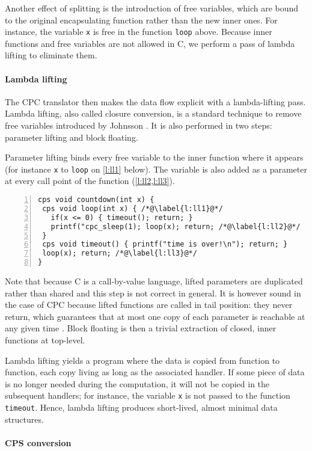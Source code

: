 \documentclass[a4paper]{llncs}
\begin{document}
Another effect of splitting is the introduction of free variables, which are
bound to the original encapsulating function rather than the new inner ones.
For instance, the variable \texttt{x} is free in the function \texttt{loop}
above.  Because inner functions and free variables are not allowed in C, we
perform a pass of lambda lifting to eliminate them.

\paragraph{Lambda lifting}

The CPC translator then makes the data flow explicit with a lambda-lifting pass.
Lambda lifting, also called closure conversion, is a standard technique to
remove free variables introduced by Johnsson \cite{DBLP:conf/fpca/Johnsson85}.
It is also performed in two steps: parameter lifting and block floating.

Parameter lifting binds every free variable to the inner function where it
appears (for instance \texttt{x} to \texttt{loop} on \cref{l:ll1} below).  The
variable is also added as a parameter at every call point of the function
(\cref{l:ll2,l:ll3}).
\begin{lstlisting}[numbers=left]
cps void countdown(int x) {
 cps void loop(int x) { /*@\label{l:ll1}@*/
   if(x <= 0) { timeout(); return; }
   printf("cpc_sleep(1); loop(x); return; /*@\label{l:ll2}@*/
 }
 cps void timeout() { printf("time is over!\n"); return; }
 loop(x); return; /*@\label{l:ll3}@*/
}
\end{lstlisting}
Note that because C is a call-by-value language, lifted parameters are
duplicated rather than shared and this step is not correct in general.
It is however sound in the case of CPC because lifted functions are called in
tail position: they never return, which guarantees that at most one copy of each
parameter is reachable at any given time \cite{kerneis2011}.
Block floating is then a trivial extraction of closed, inner functions at
top-level.

Lambda lifting yields a program where the data is copied from function to
function, each copy living as long as the associated handler.  If some piece of
data is no longer needed during the computation, it will not be copied in the
subsequent handlers; for instance, the variable \texttt{x} is not passed to the
function \texttt{timeout}. Hence, lambda lifting produces short-lived, almost
minimal data structures.

\paragraph{CPS conversion}
\end{document}
